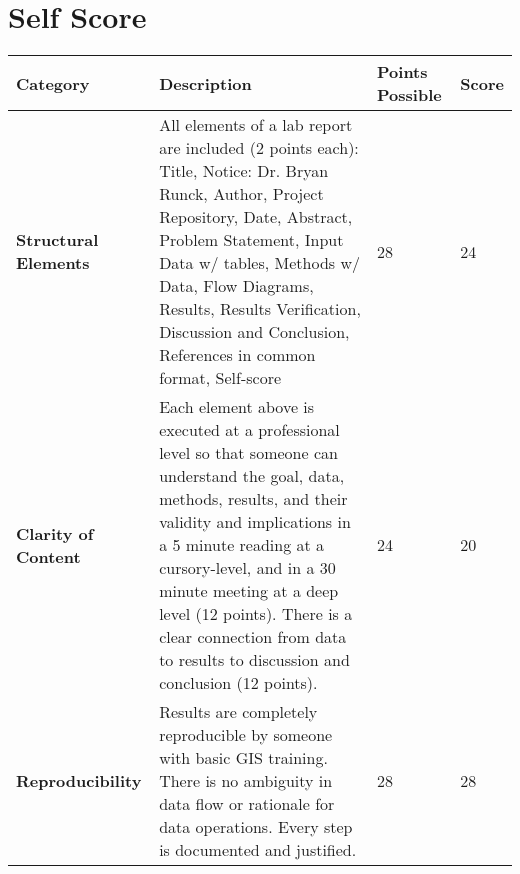 \documentclass[article,12pt]{article}
\numberwithin{equation}{section}
\begin{document}
\section*{Self Score}
\begin{tabular}{|p{.2\linewidth}|p{.2\linewidth}|p{.2\linewidth}|p{.1\linewidth}|}
	\hline
	\textbf{Category}            & \textbf{Description}                                                                                                                                                                                                                                                                                                                                              & \textbf{Points Possible} & \textbf{Score} \\ \hline
\vspace{.2in}\textbf{Structural Elements} & {\tiny All elements of a lab report are included (2 points each): Title, Notice: Dr. Bryan Runck, Author, Project Repository, Date, Abstract, Problem Statement, Input Data w/ tables, Methods w/ Data, Flow Diagrams, Results, Results Verification, Discussion and Conclusion, References in common format, Self-score}                                        & \vspace{.2in}28              &   \vspace{.2in}24    \\ \hline
	\vspace{.2in}\textbf{Clarity of Content}  & {\tiny Each element above is executed at a professional level so that someone can understand the goal, data, methods, results, and their validity and implications in a 5 minute reading at a cursory-level, and in a 30 minute meeting at a deep level (12 points). There is a clear connection from data to results to discussion and conclusion (12 points).} & \vspace{.2in}24              &  \vspace{.2in}20     \\ \hline
	\vspace{.2in}\textbf{Reproducibility}     & {\tiny Results are completely reproducible by someone with basic GIS training. There is no ambiguity in data flow or rationale for data operations. Every step is documented and justified.}                                                                                                                                                                     & \vspace{.2in}28              &     \vspace{.2in}28  \\ \hline

\end{tabular}
\end{document}
